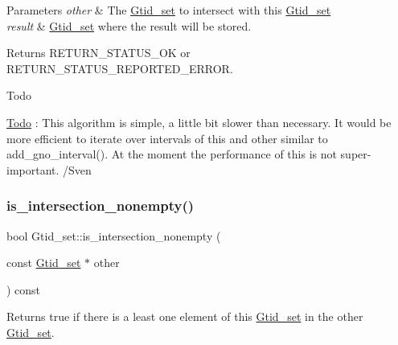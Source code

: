 \begin{DoxyParams}{Parameters}
{\em other} & The \mbox{\hyperlink{classGtid__set}{Gtid\+\_\+set}} to intersect with this \mbox{\hyperlink{classGtid__set}{Gtid\+\_\+set}} \\
\hline
{\em result} & \mbox{\hyperlink{classGtid__set}{Gtid\+\_\+set}} where the result will be stored. \\
\hline
\end{DoxyParams}
\begin{DoxyReturn}{Returns}
R\+E\+T\+U\+R\+N\+\_\+\+S\+T\+A\+T\+U\+S\+\_\+\+OK or R\+E\+T\+U\+R\+N\+\_\+\+S\+T\+A\+T\+U\+S\+\_\+\+R\+E\+P\+O\+R\+T\+E\+D\+\_\+\+E\+R\+R\+OR. 
\end{DoxyReturn}
\begin{DoxyRefDesc}{Todo}
\item[\mbox{\hyperlink{todo__todo000060}{Todo}}]\+: This algorithm is simple, a little bit slower than necessary. It would be more efficient to iterate over intervals of \textquotesingle{}this\textquotesingle{} and \textquotesingle{}other\textquotesingle{} similar to add\+\_\+gno\+\_\+interval(). At the moment the performance of this is not super-\/important. /\+Sven \end{DoxyRefDesc}
\mbox{\label{classGtid__set_a09f59bb7b9cd3a32b54bb5f8128aa5ca}} 
\subsubsection{\texorpdfstring{is\+\_\+intersection\+\_\+nonempty()}{is\_intersection\_nonempty()}}
{\footnotesize\ttfamily bool Gtid\+\_\+set\+::is\+\_\+intersection\+\_\+nonempty (\begin{DoxyParamCaption}\item[{const \mbox{\hyperlink{classGtid__set}{Gtid\+\_\+set}} $\ast$}]{other }\end{DoxyParamCaption}) const}

Returns true if there is a least one element of this \mbox{\hyperlink{classGtid__set}{Gtid\+\_\+set}} in the other \mbox{\hyperlink{classGtid__set}{Gtid\+\_\+set}}. \mbox{\label{classGtid__set_a75513b924941cde711e91e8c0f9275a0}} 
